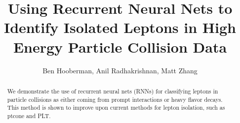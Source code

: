 \begin{frontmatter}

\title{Using Recurrent Neural Nets to Identify Isolated Leptons in High Energy Particle Collision Data}

\author{Ben Hooberman, Anil Radhakrishnan, Matt Zhang}

\address{UIUC}

\begin{abstract}
We demonstrate the use of recurrent neural nets (RNNs) for classifying leptons in particle collisions as either coming from prompt interactions or heavy flavor decays. This method is shown to improve upon current methods for lepton isolation, such as ptcone and PLT.
\end{abstract}

\end{frontmatter}